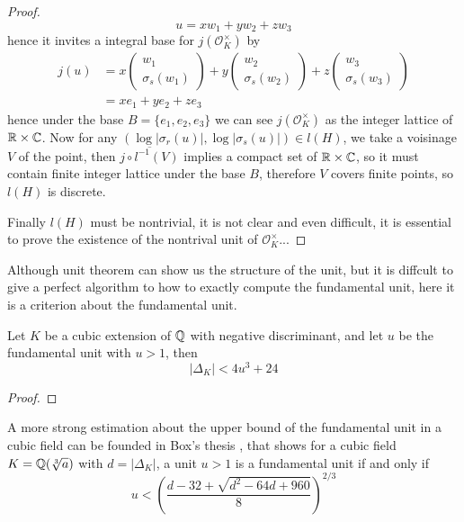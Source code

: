 \begin{theorem}
\begin{proof}
         \[u = xw_1+yw_2+zw_3\] hence it invites a integral base for \(j({\mathcal{O}_K^\times})\) by
         \begin{align*}
            j(u) &= x \begin{pmatrix}
                w_1 \\
                \sigma_s(w_1)
             \end{pmatrix}+y\begin{pmatrix}
                w_2 \\
                \sigma_s(w_2)
             \end{pmatrix}+z\begin{pmatrix}
                w_3 \\
                \sigma_s(w_3)
             \end{pmatrix} \\
             &= xe_1+ye_2+ze_3
         \end{align*}
        hence under the base \(B=\{e_1,e_2,e_3\}\) we can see \(j({\mathcal{O}_K^\times})\) as the integer lattice of \(\mathbb{R} \times \mathbb{C}\). Now for any \((\log|\sigma_r(u)|,\log|\sigma_s(u)|) \in l(H)\), we take a voisinage \(V\) of the point, then \(\overline{j\circ l^{-1}(V)}\) implies a compact set of \(\mathbb{R} \times \mathbb{C}\), so it must contain finite integer lattice under the base \(B\), therefore \(V\) covers finite points, so \(l(H)\) is discrete.

        Finally \(l(H)\) must be nontrivial, it is not clear and even difficult, it is essential to prove the existence of the nontrival unit of \(\mathcal{O}_K^{\times}\)...
    \end{proof}
\end{theorem}

Although unit theorem can show us the structure of the unit, but it is diffcult to give a perfect algorithm to how to exactly compute the fundamental unit, here it is a criterion about the fundamental unit.
\begin{lemma} \label{criterion}
    Let \(K\) be a cubic extension of \(\mathbb{Q}\) with negative discriminant, and let \(u\) be the fundamental unit with \(u>1\), then 
    \[|\Delta_K| < 4 u^3 + 24\]

    \begin{proof}
        
    \end{proof}
\end{lemma}

A more strong estimation about the upper bound of the fundamental unit in a cubic field can be founded in Box's thesis \cite[Theorem 1.82]{box2014introduction}, that shows for a cubic field \(K = \mathbb{Q}(\sqrt[3]{a})\) with \(d = |\Delta_K|\), a unit \(u>1\) is a fundamental unit if and only if 
\[u < (\frac{d-32+\sqrt{d^2-64d+960}}{8})^{2/3}\]
